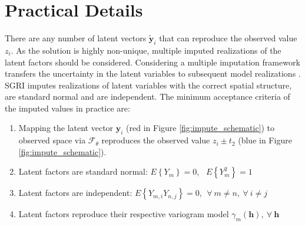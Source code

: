 \section{Practical Details}
\label{sec:details}

There are any number of latent vectors $\tilde{\mathbf{y}}_{i}$ that can reproduce the observed value $z_{i}$. As the solution is highly non-unique, multiple imputed realizations of the latent factors should be considered. Considering a multiple imputation framework transfers the uncertainty in the latent variables to subsequent model realizations \citep{silva2017multiple}. \Gls{SGRI} imputes realizations of latent variables with the correct spatial structure, are standard normal and are independent. The minimum acceptance criteria of the imputed values in practice are:

\begin{enumerate}[noitemsep]
    \item Mapping the latent vector $\mathbf{y}_{i}$ (red in Figure \ref{fig:impute_schematic}) to observed space via $\mathcal{F}_{\theta}$  reproduces the observed value $z_{i} \pm t_{2}$ (blue in Figure \ref{fig:impute_schematic}).
    \item Latent factors are standard normal: $E\left\{Y_{m}\right\}=0$, \ $E\left\{Y_{m}^{2}\right\}=1$
    \item Latent factors are independent: $E\left\{Y_{m,i}Y_{n,j}\right\}=0, \ \ \forall \ m\neq n, \ \forall \ i \neq j$
    \item Latent factors reproduce their respective variogram model $\gamma_m(\mathbf{h}), \ \forall \ \mathbf{h}$
\end{enumerate}

